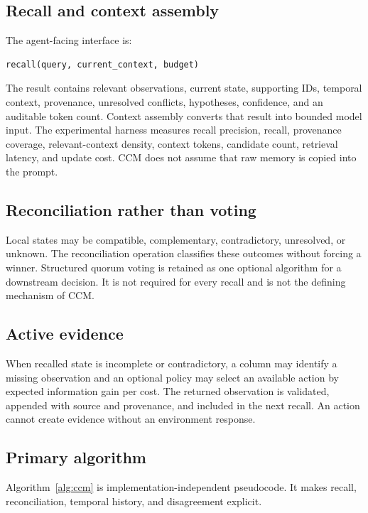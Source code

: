 \subsection{Recall and context assembly}

The agent-facing interface is:

\begin{verbatim}
recall(query, current_context, budget)
\end{verbatim}

The result contains relevant observations, current state, supporting IDs, temporal context, provenance, unresolved conflicts, hypotheses, confidence, and an auditable token count. Context assembly converts that result into bounded model input. The experimental harness measures recall precision, recall, provenance coverage, relevant-context density, context tokens, candidate count, retrieval latency, and update cost. CCM does not assume that raw memory is copied into the prompt.

\subsection{Reconciliation rather than voting}

Local states may be compatible, complementary, contradictory, unresolved, or unknown. The reconciliation operation classifies these outcomes without forcing a winner. Structured quorum voting is retained as one optional algorithm for a downstream decision. It is not required for every recall and is not the defining mechanism of CCM.

\subsection{Active evidence}

When recalled state is incomplete or contradictory, a column may identify a missing observation and an optional policy may select an available action by expected information gain per cost. The returned observation is validated, appended with source and provenance, and included in the next recall. An action cannot create evidence without an environment response.

\subsection{Primary algorithm}

Algorithm~\ref{alg:ccm} is implementation-independent pseudocode. It makes recall, reconciliation, temporal history, and disagreement explicit.

